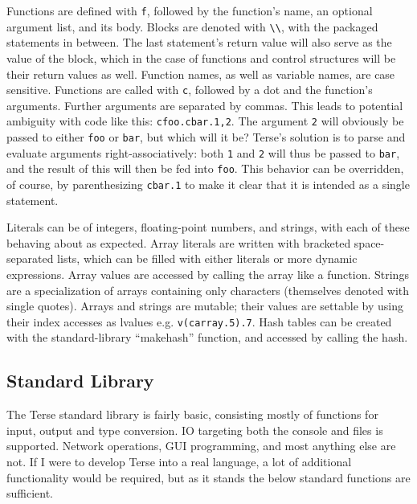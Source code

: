 \documentclass[12pt]{report}
\newcommand{\code}[1]{\texttt{#1}}
\newcommand{\bs}{\textbackslash}
\begin{document}
Functions are defined with \code{f}, followed by the function's name,
an optional argument list, and its body. Blocks are denoted with
\code{\bs \bs}, with the packaged statements in between. The last
statement's return value will also serve as the value of the block,
which in the case of functions and control structures will be their
return values as well. Function names, as well as variable names, are
case sensitive. Functions are called with \code{c}, followed by a dot
and the function's arguments. Further arguments are separated by
commas. This leads to potential ambiguity with code like this:
\code{cfoo.cbar.1,2}. The argument \code{2} will obviously be passed
to either \code{foo} or \code{bar}, but which will it be? Terse's
solution is to parse and evaluate arguments right-associatively: both
\code{1} and \code{2} will thus be passed to \code{bar}, and the
result of this will then be fed into \code{foo}. This behavior can be
overridden, of course, by parenthesizing \code{cbar.1} to make it
clear that it is intended as a single statement.

Literals can be of integers, floating-point numbers, and strings, with
each of these behaving about as expected.  Array literals are written
with bracketed space-separated lists, which can be filled with either
literals or more dynamic expressions. Array values are accessed by
calling the array like a function. Strings are a specialization of
arrays containing only characters (themselves denoted with single
quotes). Arrays and strings are mutable; their values are settable by
using their index accesses as lvalues e.g. \code{v(carray.5).7}. Hash
tables can be created with the standard-library ``makehash'' function,
and accessed by calling the hash.

\subsection*{Standard Library}

The Terse standard library is fairly basic, consisting mostly of
functions for input, output and type conversion. IO targeting both the
console and files is supported. Network operations, GUI programming,
and most anything else are not. If I were to develop Terse into a real
language, a lot of additional functionality would be required, but as
it stands the below standard functions are sufficient.
\end{document}
